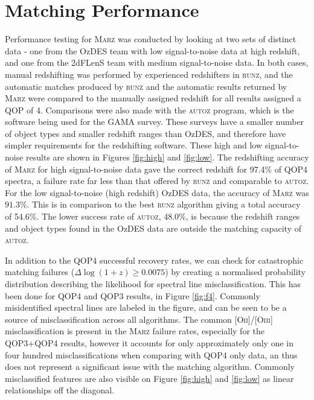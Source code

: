 \documentclass[5p]{elsarticle}
\newcommand{\runz}{\textsc{runz}}
\newcommand{\autoz}{\textsc{autoz}}
\newcommand{\marz}{\textsc{Marz}}
\begin{document}
\section{Matching Performance} \label{sec:perf}

Performance testing for \marz{} was conducted by looking at two sets of distinct data - one from the OzDES team with low signal-to-noise data at high redshift, and one from the 2dFLenS team with medium signal-to-noise data. In both cases, manual redshifting was performed by experienced redshifters in \runz{}, and the automatic matches produced by \runz{} and the automatic results returned by \marz{} were compared to the manually assigned redshift for all results assigned a QOP of 4. Comparisons were also made with the \autoz{} program, which is the software being used for the GAMA survey. These surveys have a smaller number of object types and smaller redshift ranges than OzDES, and therefore have simpler requirements for the redshifting software. These high and low signal-to-noise results are shown in Figures \ref{fig:high} and \ref{fig:low}. The redshifting accuracy of \marz{} for high signal-to-noise data gave the correct redshift for 97.4\% of QOP4 spectra, a failure rate far less than that offered by \runz{} and comparable to \autoz{}. For the low signal-to-noise (high redshift) OzDES data, the accuracy of \marz{} was $91.3$\%. This is in comparison to the best \runz{} algorithm giving a total accuracy of 54.6\%. The lower success rate of \autoz, 48.0\%, is because the redshift ranges and object types found in the OzDES data are outside the matching capacity of \autoz{}.

In addition to the QOP4 successful recovery rates, we can check for catastrophic matching failures ($\Delta \log(1+z) \geq 0.0075$) by creating a normalised probability distribution describing the likelihood for spectral line misclassification. This has been done for QOP4 and QOP3 results, in Figure \ref{fig:f4}. Commonly misidentified spectral lines are labeled in the figure, and can be seen to be a source of misclassification across all algorithms. The common [O\textsc{ii}]/[O\textsc{iii}] misclassification is present in the \marz{} failure rates, especially for the QOP3+QOP4 results, however it accounts for only approximately only one in four hundred misclassifications when comparing with QOP4 only data, an thus does not represent a significant issue with the matching algorithm. Commonly misclassified features are also visible on Figure \ref{fig:high} and \ref{fig:low} as linear relationships off the diagonal.
\end{document}
